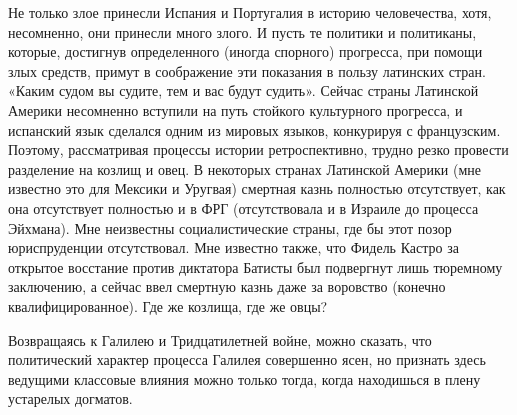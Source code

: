 Не только злое  принесли Испания и Португалия  в историю человечества,
хотя,  несомненно,  они принесли  много  злого.  И пусть  те  политики
и  политиканы,  которые,  достигнув  определенного  (иногда  спорного)
прогресса, при помощи злых средств, примут в соображение эти показания
в пользу  латинских стран.  «Каким судом  вы судите,  тем и  вас будут
судить». Сейчас  страны Латинской Америки несомненно  вступили на путь
стойкого  культурного  прогресса,  и  испанский  язык  сделался  одним
из  мировых языков,  конкурируя с  французским. Поэтому,  рассматривая
процессы истории  ретроспективно, трудно резко провести  разделение на
козлищ и овец. В некоторых странах Латинской Америки (мне известно это
для Мексики и  Уругвая) смертная казнь полностью  отсутствует, как она
отсутствует полностью и  в ФРГ (отсутствовала и в  Израиле до процесса
Эйхмана). Мне  неизвестны социалистические  страны, где бы  этот позор
юриспруденции отсутствовал.  Мне известно также, что  Фидель Кастро за
открытое  восстание  против  диктатора  Батисты  был  подвергнут  лишь
тюремному заключению, а  сейчас ввел смертную казнь  даже за воровство
(конечно квалифицированное). Где же козлища, где же овцы?

Возвращаясь  к  Галилею и  Тридцатилетней  войне,  можно сказать,  что
политический характер  процесса Галилея  совершенно ясен,  но признать
здесь ведущими классовые влияния  можно только тогда, когда находишься
в плену устарелых догматов.

